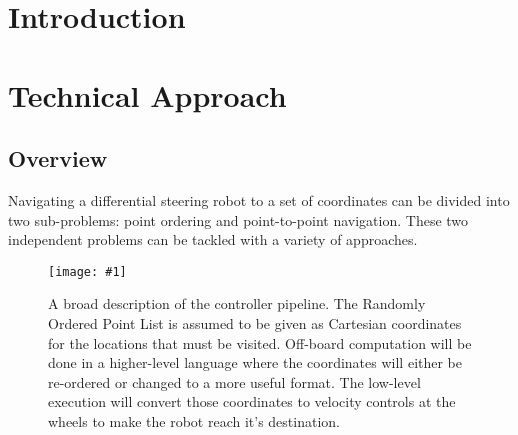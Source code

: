 \documentclass[12pt,conference,onecolumn]{IEEEtran} %
\newcommand{\myfigure}[4]{
  \begin{figure}[h!]
      \centering
      \texttt{[image: \#1]}
      \caption{#2}
\label{#4}
    \end{figure}
}
\begin{document}
\clearpage

\section{Introduction} 

\section{Technical Approach}

\subsection{Overview}
Navigating a differential steering robot to a set of coordinates can be divided into two sub-problems: point ordering and point-to-point navigation. These two independent problems can be tackled with a variety of approaches.

\myfigure{images/Pipeline.jpg}{A broad description of the controller pipeline. The Randomly Ordered Point List is assumed to be given as Cartesian coordinates for the locations that must be visited. Off-board computation will be done in a higher-level language where the coordinates will either be re-ordered or changed to a more useful format. The low-level execution will convert those coordinates to velocity controls at the wheels to make the robot reach it's destination.}{0.5}{fig:pipeline}
\end{document}
